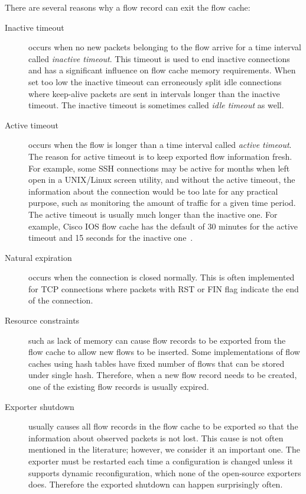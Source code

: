 There are several reasons why a flow record can exit the flow cache:
\begin{description}
    \item[Inactive timeout] occurs when no new packets belonging to the flow arrive for a time interval called \emph{inactive timeout}. This timeout is used to end inactive connections and has a significant influence on flow cache memory requirements. When set too low the inactive timeout can erroneously split idle connections where keep-alive packets are sent in intervals longer than the inactive timeout. The inactive timeout is sometimes called \emph{idle timeout} as well.
    \item[Active timeout] occurs when the flow is longer than a time interval called \emph{active timeout}. The reason for active timeout is to keep exported flow information fresh. For example, some SSH connections may be active for months when left open in a UNIX/Linux screen utility, and without the active timeout, the information about the connection would be too late for any practical purpose, such as monitoring the amount of traffic for a given time period. The active timeout is usually much longer than the inactive one. For example, Cisco IOS flow cache has the default of 30 minutes for the active timeout and 15 seconds for the inactive one~\cite{CiscoSystems-2013-Cisco}.
    \item[Natural expiration] occurs when the connection is closed normally. This is often implemented for TCP connections where packets with RST or FIN flag indicate the end of the connection.
    \item[Resource constraints] such as lack of memory can cause flow records to be exported from the flow cache to allow new flows to be inserted. Some implementations of flow caches using hash tables have fixed number of flows that can be stored under single hash. Therefore, when a new flow record needs to be created, one of the existing flow records is usually expired.
    \item[Exporter shutdown] usually causes all flow records in the flow cache to be exported so that the information about observed packets is not lost. This cause is not often mentioned in the literature; however, we consider it an important one. The exporter must be restarted each time a configuration is changed unless it supports dynamic reconfiguration, which none of the open-source exporters does. Therefore the exported shutdown can happen surprisingly often.
\end{description}

